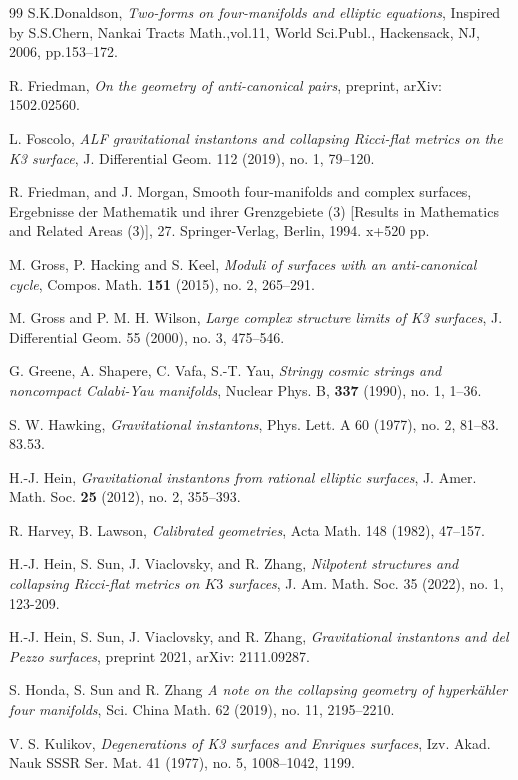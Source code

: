\documentclass[11pt]{amsart}
\theoremstyle{plain}
\theoremstyle{definition}
\numberwithin{equation}{section}
\begin{document}
\begin{thebibliography}{99}
	 S.K.Donaldson, {\em Two-forms on four-manifolds and elliptic equations}, Inspired by S.S.Chern, Nankai Tracts Math.,vol.11, World Sci.Publ., Hackensack, NJ, 2006, pp.153–172.
	
	 R. Friedman, {\em On the geometry of anti-canonical pairs}, preprint, arXiv: 1502.02560.
	
	 L. Foscolo, {\em ALF gravitational instantons and collapsing Ricci-flat metrics on the K3 surface}, J. Differential Geom. 112 (2019), no. 1, 79–120.
	
	 R. Friedman, and J. Morgan, Smooth four-manifolds and complex surfaces, Ergebnisse der Mathematik und ihrer Grenzgebiete (3) [Results in Mathematics and Related Areas (3)], 27. Springer-Verlag, Berlin, 1994. x+520 pp.
	
	 M. Gross, P. Hacking and S. Keel, {\em Moduli of surfaces with an anti-canonical cycle}, Compos. Math. {\bf 151} (2015), no. 2, 265--291.
	
	 M. Gross and P. M. H. Wilson, {\em Large complex structure limits of K3 surfaces}, J. Differential Geom. 55 (2000), no. 3, 475–546.
	
	 G. Greene, A. Shapere, C. Vafa, S.-T. Yau, {\em Stringy cosmic strings and noncompact Calabi-Yau manifolds}, Nuclear Phys. B, {\bf 337} (1990), no. 1, 1--36.
	
	
	 S. W. Hawking, {\em Gravitational instantons}, Phys. Lett. A 60 (1977), no. 2, 81–83. 83.53.
	
	 H.-J. Hein, {\em Gravitational instantons from rational elliptic surfaces}, J. Amer. Math. Soc. {\bf 25} (2012), no. 2, 355--393.
	
	 R. Harvey, B. Lawson, {\em 
		Calibrated geometries},
	Acta Math. 148 (1982), 47–157.
	
	 H.-J. Hein, S. Sun, J. Viaclovsky, and R. Zhang, {\em Nilpotent structures and collapsing Ricci-flat metrics on $K3$ surfaces}, J. Am. Math. Soc. 35 (2022), no. 1, 123-209.
	
	  H.-J. Hein, S. Sun, J. Viaclovsky, and R. Zhang, {\em Gravitational instantons and del Pezzo surfaces}, preprint 2021, arXiv: 2111.09287.
	
	 S. Honda, S. Sun and R. Zhang
	{\em A note on the collapsing geometry of hyperkähler four manifolds}, 
	Sci. China Math. 62 (2019), no. 11, 2195–2210.
	
	 V. S. Kulikov, {\em Degenerations of K3 surfaces and Enriques surfaces},  Izv. Akad. Nauk SSSR Ser. Mat. 41 (1977), no. 5, 1008–1042, 1199.
%	
	

\end{thebibliography}
\end{document}
